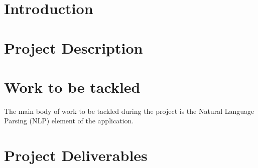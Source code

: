 \documentclass[12pt,a4paper]{article}
\begin{document}



\setlength{\parindent}{0pt}
\setlength{\parskip}{1.5ex plus 0.5ex minus 0.2ex}

\tableofcontents

\pagebreak

\section{Introduction}

\section{Project Description}

\section{Work to be tackled}

The main body of work to be tackled during the project is the Natural Language
Parsing (NLP) element of the application. 

\section{Project Deliverables}

\pagebreak



\nocite{*}

\end{document}
